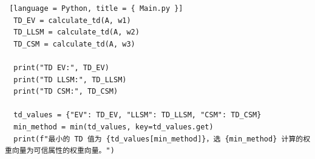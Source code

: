 \begin{lstlisting} [language = Python, title = { Main.py }]
  TD_EV = calculate_td(A, w1)
  TD_LLSM = calculate_td(A, w2)
  TD_CSM = calculate_td(A, w3)
  
  print("TD EV:", TD_EV)
  print("TD LLSM:", TD_LLSM)
  print("TD CSM:", TD_CSM)
  
  td_values = {"EV": TD_EV, "LLSM": TD_LLSM, "CSM": TD_CSM}
  min_method = min(td_values, key=td_values.get)
  print(f"最小的 TD 值为 {td_values[min_method]}，选 {min_method} 计算的权重向量为可信属性的权重向量。")  
\end{lstlisting}
